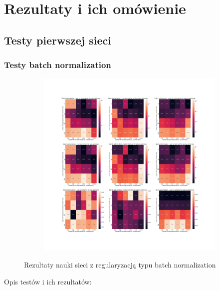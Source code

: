 \documentclass[12pt]{article}
\begin{document}
\section{Rezultaty i ich omówienie}
\subsection{Testy pierwszej sieci}\label{tit:ann}
\subsubsection{Testy batch normalization}
\begin{figure}[h!]
	\centering
	\begin{subfigure}[b]{1\linewidth}
		\includegraphics[width=\linewidth]{Comparision_batch_norm_ann_0.png}
	\end{subfigure}
	\caption{Rezultaty nauki sieci z regularyzacją typu batch normalization}
	\label{fig:batch_ann}
\end{figure}
Opis testów i ich rezultatów:
\end{document}
